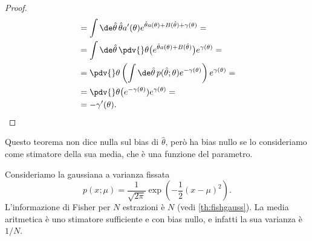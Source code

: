 \begin{proof}
\begin{align*}
		&= \int\de\hat\theta\, \hat\theta a'(\theta) e^{\hat\theta a(\theta)+B(\hat\theta)+\gamma(\theta)} = \\
		&= \int\de\hat\theta\, \pdv{}\theta \big(e^{\hat\theta a(\theta)+B(\hat\theta)}\big) e^{\gamma(\theta)} = \\
		&= \pdv{}\theta \left( \int\de\hat\theta\, p(\hat\theta;\theta) e^{-\gamma(\theta)} \right) e^{\gamma(\theta)} = \\
		&= \pdv{}\theta \big(e^{-\gamma(\theta)})e^{\gamma(\theta)} = \\
		&= -\gamma'(\theta). \qedhere
	\end{align*}
\end{proof}

Questo teorema non dice nulla sul bias di $\hat\theta$,
però ha bias nullo se lo consideriamo come stimatore della sua media,
che è una funzione del parametro.

\begin{example}
	Consideriamo la gaussiana a varianza fissata
	\begin{equation*}
		p(x;\mu)
		= \frac1{\sqrt{2\pi}} \exp\left(-\frac12 (x-\mu)^2\right).
	\end{equation*}
	L'informazione di Fisher per $N$ estrazioni è $N$ (vedi \autoref{th:fishgauss}).
	La media aritmetica è uno stimatore sufficiente e con bias nullo,
	e infatti la sua varianza è $1/N$.
\end{example}

